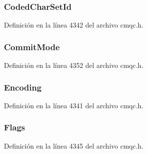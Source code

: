 \subsubsection[{Coded\+Char\+Set\+Id}]{ Coded\+Char\+Set\+Id}\label{structtag_m_q_i_i_h_a4d8d1961a991850d1355cdf9b4680b8e}


Definición en la línea 4342 del archivo cmqc.\+h.

\hypertarget{structtag_m_q_i_i_h_a24abe6b52c8bd4d61e986bc4cbd21055}{}
\subsubsection[{Commit\+Mode}]{ Commit\+Mode}\label{structtag_m_q_i_i_h_a24abe6b52c8bd4d61e986bc4cbd21055}


Definición en la línea 4352 del archivo cmqc.\+h.

\hypertarget{structtag_m_q_i_i_h_a30167bf454a49a60fd3fe4e9e586af34}{}
\subsubsection[{Encoding}]{ Encoding}\label{structtag_m_q_i_i_h_a30167bf454a49a60fd3fe4e9e586af34}


Definición en la línea 4341 del archivo cmqc.\+h.

\hypertarget{structtag_m_q_i_i_h_a8da770267273b200fa9c968fa2a0da57}{}
\subsubsection[{Flags}]{ Flags}\label{structtag_m_q_i_i_h_a8da770267273b200fa9c968fa2a0da57}


Definición en la línea 4345 del archivo cmqc.\+h.

\hypertarget{structtag_m_q_i_i_h_a435a478822008713f8aaff89f369ed63}{}
